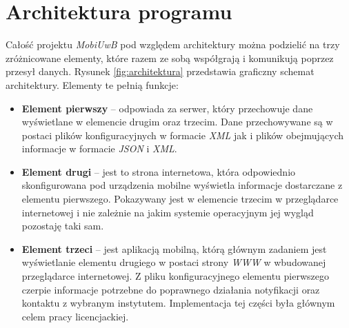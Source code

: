 \documentclass{iiuwb}
\begin{document}
\section{Architektura programu}
Całość projektu \textit{MobiUwB} pod względem architektury można podzielić na trzy zróżnicowane elementy, które razem ze sobą współgrają i komunikują poprzez przesył danych. Rysunek \ref{fig:architektura} przedstawia graficzny schemat architektury. Elementy te pełnią funkcje:
\begin{itemize}
\item \textbf{Element pierwszy} -- odpowiada za serwer, który przechowuje dane wyświetlane w elemencie drugim oraz trzecim. Dane przechowywane są w postaci plików konfiguracyjnych w formacie \textit{XML} jak i plików obejmujących informacje w formacie \textit{JSON} i \textit{XML}.
\item \textbf{Element drugi} -- jest to strona internetowa, która odpowiednio skonfigurowana pod urządzenia mobilne wyświetla informacje dostarczane z elementu pierwszego. Pokazywany jest w elemencie trzecim w przeglądarce internetowej i nie zależnie na jakim systemie operacyjnym jej wygląd pozostaję taki sam. 
\item \textbf{Element trzeci} -- jest aplikacją mobilną, którą głównym zadaniem jest wyświetlanie elementu drugiego w postaci strony \textit{WWW} w wbudowanej przeglądarce internetowej. Z pliku konfiguracyjnego elementu pierwszego czerpie informacje potrzebne do poprawnego działania notyfikacji oraz kontaktu z wybranym instytutem. Implementacja tej części była głównym celem pracy licencjackiej.
\end{itemize}
\end{document}
